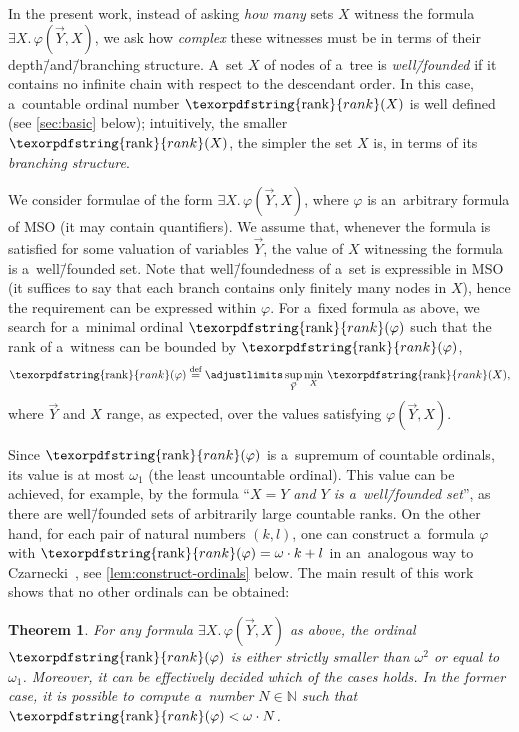 \documentclass[11pt,a4paper]{amsart}
\theoremstyle{plain}
\newtheorem{thm}{Theorem}[section]
\theoremstyle{definition}
\theoremstyle{defC}
\theoremstyle{thmC}
\theoremstyle{plain}
\numberwithin{equation}{section}
\numberwithin{equation}{section}
\numberwithin{figure}{section}
\newcommand{\ident}[1]{\ensuremath{\texorpdfstring{\mathrm{\mathnm{#1}}}{#1}}\xspace}
\newcommand{\domain}[1]{\ensuremath{\mathbb{#1}}\xspace}
\newcommand{\N}{\domain{N}}
\newcommand{\eqdef}{\stackrel{\text{def}}=}
\newcommand{\mathnm}[1]{#1}
\newcommand{\rank}{\ident{rank}}
\renewcommand\phi\varphi
\newcommand{\limit}{\ident{rank}}
\begin{document}
In the present work, instead of asking \emph{how many} sets $X$ witness the formula $\exists X.\, \varphi(\vec{Y},X)$,
we ask how \emph{complex} these witnesses must be in terms of their depth\=/and\=/branching structure.
A~set $X$ of nodes of a~tree is \emph{well\=/founded} if it contains no infinite chain with respect to the descendant order.
In this case, a~countable ordinal number $\rank(X)$ is well defined (see \cref{sec:basic} below);
intuitively, the smaller $\rank(X)$, the simpler the set $X$ is, in terms of its \emph{branching structure}.

We consider formulae of the form $\exists X.\, \varphi(\vec{Y}, X)$, where $\varphi$ is an~arbitrary formula of MSO (it may contain quantifiers).
We assume that, whenever the formula is satisfied for some valuation of variables $\vec{Y}$, the value of $X$ witnessing the formula is a~well\=/founded set.
Note that well\=/foundedness of a~set is expressible in MSO (it suffices to say that each branch contains only finitely many nodes in $X$),
hence the requirement can be expressed within $\varphi$.
For a~fixed formula as above, we search for a~minimal ordinal $\limit(\phi)$ such that the rank of a~witness can be bounded by $\limit(\phi)$,
\begin{equation}\label{eq:eta-for-phi}
	\limit(\phi) \eqdef\adjustlimits\sup_{\vec{Y}}\min_{X}\, \rank(X),
\end{equation}
where $\vec{Y}$ and $X$ range, as expected, over the values satisfying $\varphi(\vec{Y}, X)$.

Since $\limit(\phi)$ is a~supremum of countable ordinals, its value is at most $\omega_1$ (the least uncountable ordinal).
This value can be achieved, for example, by the formula ``\emph{$X = Y$ and $Y$ is a~well\=/founded set}'',
as there are well\=/founded sets of arbitrarily large countable ranks.
On the other hand, for each pair of natural numbers $(k,l)$, one can construct a~formula $\varphi$ with $\limit(\phi) = \omega\cdot k+l$
in an~analogous way to Czarnecki~\cite{czarnecki_closure_fics}, see \cref{lem:construct-ordinals} below.
The main result of this work shows that no other ordinals can be obtained:


\begin{thm}\label{thm:main}
	For any formula $\exists X.\, \varphi(\vec{Y}, X)$ as above, the ordinal $\limit(\phi)$ is either strictly smaller than $\omega^2$ or equal to $\omega_1$.
	Moreover, it can be effectively decided which of the cases holds.
	In the former case, it is possible to compute a~number $N\in\N$ such that $\limit(\phi)< \omega\cdot N$.
\end{thm}
\end{document}

